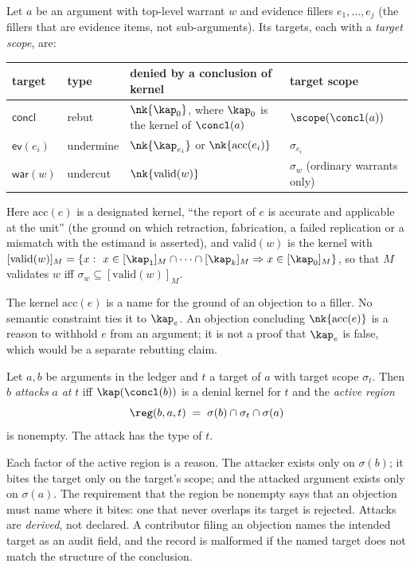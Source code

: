 \begin{definition}\label{def:targets}
Let $a$ be an argument with top-level warrant $w$ and evidence fillers $e_1,\dots,e_j$ (the fillers that are evidence items, not sub-arguments). Its targets, each with a \emph{target scope}, are:
\begin{center}
\begin{tabularx}{\textwidth}{@{}llXl@{}}
\toprule
target & type & denied by a conclusion of kernel & target scope\\
\midrule
$\mathsf{concl}$ & rebut & $\nk{\kap_0}$, where $\kap_0$ is the kernel of $\concl(a)$ & $\scope(\concl(a))$\\
$\mathsf{ev}(e_i)$ & undermine & $\nk{\kap_{e_i}}$ or $\nk{\mathrm{acc}(e_i)}$ & $\sigma_{e_i}$\\
$\mathsf{war}(w)$ & undercut & $\nk{\mathrm{valid}(w)}$ & $\sigma_w$ (ordinary warrants only)\\
\bottomrule
\end{tabularx}
\end{center}
Here $\mathrm{acc}(e)$ is a designated kernel, ``the report of $e$ is accurate and applicable at the unit'' (the ground on which retraction, fabrication, a failed replication or a mismatch with the estimand is asserted), and $\mathrm{valid}(w)$ is the kernel with $[\mathrm{valid}(w)]_M=\{x:\ x\in[\kap_1]_M\cap\dots\cap[\kap_k]_M\Rightarrow x\in[\kap_0]_M\}$, so that $M$ validates $w$ iff $\sigma_w\subseteq[\mathrm{valid}(w)]_M$.
\end{definition}

The kernel $\mathrm{acc}(e)$ is a name for the ground of an objection to a filler. No semantic constraint ties it to $\kap_e$. An objection concluding $\nk{\mathrm{acc}(e)}$ is a reason to withhold $e$ from an argument; it is not a proof that $\kap_e$ is false, which would be a separate rebutting claim.

\begin{definition}\label{def:attack}
Let $a,b$ be arguments in the ledger and $t$ a target of $a$ with target scope $\sigma_t$. Then $b$ \emph{attacks} $a$ \emph{at} $t$ iff $\kap(\concl(b))$ is a denial kernel for $t$ and the \emph{active region}
\[
\reg(b,a,t)\;=\;\sigma(b)\cap\sigma_t\cap\sigma(a)
\]
is nonempty. The attack has the type of $t$.
\end{definition}

Each factor of the active region is a reason. The attacker exists only on $\sigma(b)$; it bites the target only on the target's scope; and the attacked argument exists only on $\sigma(a)$. The requirement that the region be nonempty says that an objection must name where it bites: one that never overlaps its target is rejected. Attacks are \emph{derived}, not declared. A contributor filing an objection names the intended target as an audit field, and the record is malformed if the named target does not match the structure of the conclusion.

